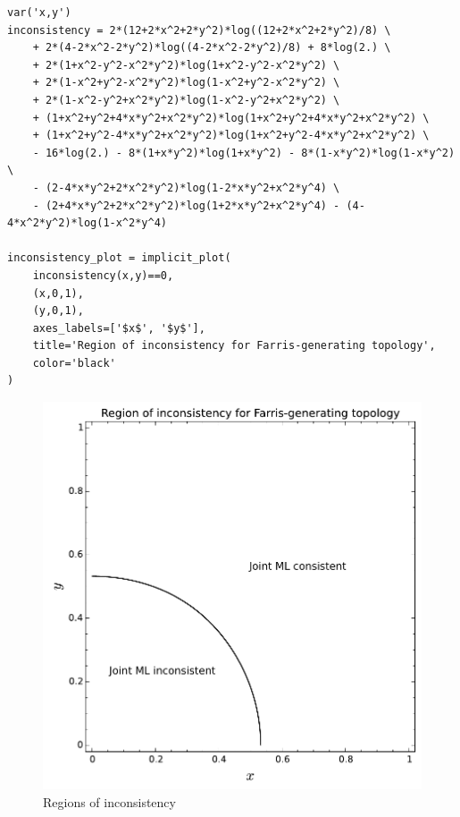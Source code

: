\documentclass[a4paper]{article}
\begin{document}
\begin{table}
    \begin{center}
\begin{verbatim}
var('x,y')
inconsistency = 2*(12+2*x^2+2*y^2)*log((12+2*x^2+2*y^2)/8) \
    + 2*(4-2*x^2-2*y^2)*log((4-2*x^2-2*y^2)/8) + 8*log(2.) \
    + 2*(1+x^2-y^2-x^2*y^2)*log(1+x^2-y^2-x^2*y^2) \
    + 2*(1-x^2+y^2-x^2*y^2)*log(1-x^2+y^2-x^2*y^2) \
    + 2*(1-x^2-y^2+x^2*y^2)*log(1-x^2-y^2+x^2*y^2) \
    + (1+x^2+y^2+4*x*y^2+x^2*y^2)*log(1+x^2+y^2+4*x*y^2+x^2*y^2) \
    + (1+x^2+y^2-4*x*y^2+x^2*y^2)*log(1+x^2+y^2-4*x*y^2+x^2*y^2) \
    - 16*log(2.) - 8*(1+x*y^2)*log(1+x*y^2) - 8*(1-x*y^2)*log(1-x*y^2) \
    - (2-4*x*y^2+2*x^2*y^2)*log(1-2*x*y^2+x^2*y^4) \
    - (2+4*x*y^2+2*x^2*y^2)*log(1+2*x*y^2+x^2*y^4) - (4-4*x^2*y^2)*log(1-x^2*y^4)

inconsistency_plot = implicit_plot(
    inconsistency(x,y)==0,
    (x,0,1),
    (y,0,1),
    axes_labels=['$x$', '$y$'],
    title='Region of inconsistency for Farris-generating topology',
    color='black'
)
\end{verbatim}
    \end{center}
\caption{Sage code to generate Fig.~\ref{fig:inconsistency-farris}}
\label{list:sage}
\end{table}

\begin{figure}
\centering
\includegraphics[width=.9\textwidth]{analytic-inconsistency}
\caption{Regions of inconsistency}
\label{fig:inconsistency-farris}
\end{figure}
\end{document}

